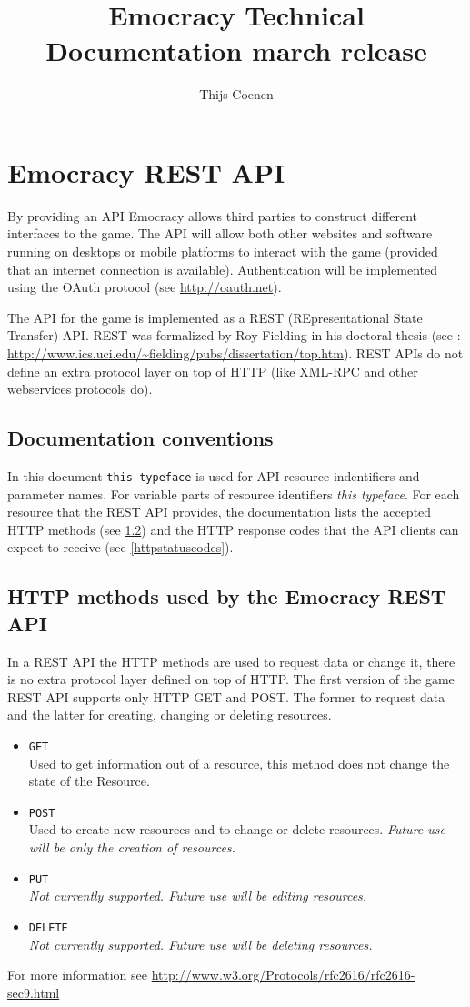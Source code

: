 \documentclass[a4paper]{report}
\author{Thijs Coenen}
\title{Emocracy Technical Documentation march release}
\begin{document}
\maketitle
\tableofcontents
\chapter{Emocracy REST API}
By providing an API Emocracy allows third parties to construct different 
interfaces to the game. The API will allow both other websites and 
software running on desktops or mobile platforms to interact with the game 
(provided that an internet connection is available). Authentication will be 
implemented using the OAuth protocol (see \url{http://oauth.net}).

The API for the game is implemented as a REST (REpresentational State Transfer) 
API. REST was formalized by Roy Fielding in his doctoral thesis (see : 
\url{http://www.ics.uci.edu/\~fielding/pubs/dissertation/top.htm}). REST APIs do
not define an extra protocol layer on top of HTTP (like XML-RPC and other 
webservices protocols do).

\section{Documentation conventions}
In this document \texttt{this typeface} is used for API resource indentifiers 
and parameter names. For variable parts of resource identifiers \emph{this 
typeface}. For each resource that the REST API provides, the documentation lists
the accepted HTTP methods (see \ref{httpmethods}) and the HTTP response codes 
that the API clients can expect to receive (see \ref{httpstatuscodes}).

\section{HTTP methods used by the Emocracy REST API}\label{httpmethods}
In a REST API the HTTP methods are used to request data or change it, there is
no extra protocol layer defined on top of HTTP. The first version of the game
REST API supports only HTTP GET and POST. The former to request data and the 
latter for creating, changing or deleting resources.
\begin{itemize}
    \item{\texttt{GET}\\
    Used to get information out of a resource, this method does not change the 
    state of the Resource.}
    \item{\texttt{POST}\\
    Used to create new resources and to change or delete resources. 
    \emph{Future use will be only the creation of resources.}}
    \item{\texttt{PUT}\\
    \emph{Not currently supported. Future use will be editing resources.}}
    \item{\texttt{DELETE}\\
    \emph{Not currently supported. Future use will be deleting resources.}}
\end{itemize}
For more information see \mbox{\url{http://www.w3.org/Protocols/rfc2616/rfc2616-sec9.html}}
\end{document}
